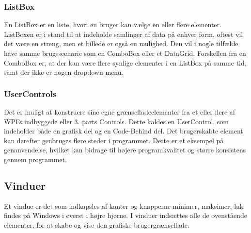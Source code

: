 \subsubsection*{ListBox}
En ListBox er en liste, hvori en bruger kan vælge en eller flere elementer.
ListBoxen er i stand til at indeholde samlinger af data på enhver form, oftest vil det være en streng, men et billede er også en mulighed.
Den vil i nogle tilfælde have samme brugsscenarie som en ComboBox eller et DataGrid. 
Forskellen fra en ComboBox er, at der kan være flere synlige elementer i en ListBox på samme tid, samt der ikke er nogen dropdown menu.

\subsubsection*{UserControls}
Det er muligt at konstruere sine egne grænsefladeelementer fra et eller flere af WPFs indbyggede eller 3. parts Controls.
Dette kaldes en UserControl, som indeholder både en grafisk del og en Code-Behind del.
Det brugerskabte element kan derefter genbruges flere steder i programmet.
Dette er et eksempel på genanvendelse, hvilket kan bidrage til højere programkvalitet og større konsistens gennem programmet. 

\subsection*{Vinduer}
Et vindue er det som indkapsles af kanter og knapperne minimer, maksimer, luk findes på Windows i øverst i højre hjørne.
I vinduer indsættes alle de ovenstående elementer, for at skabe og vise den grafiske brugergrænseflade.
